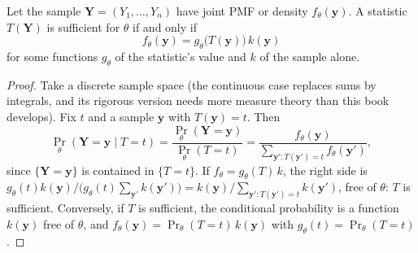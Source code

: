 \begin{theorem}
\label{thm:factorization}
Let the sample $\mathbf{Y} = (Y_1, \ldots, Y_n)$ have joint PMF or density $f_\theta(\mathbf{y})$.
A statistic $T(\mathbf{Y})$ is sufficient for $\theta$ if and only if
\[
f_\theta(\mathbf{y}) = g_\theta\big(T(\mathbf{y})\big)\,k(\mathbf{y})
\]
for some functions $g_\theta$ of the statistic's value and $k$ of the sample alone.
\end{theorem}
\begin{proof}
Take a discrete sample space (the continuous case replaces sums by integrals, and its rigorous version needs more measure theory than this book develops).
Fix $t$ and a sample $\mathbf{y}$ with $T(\mathbf{y}) = t$.
Then
\[
\Pr_\theta(\mathbf{Y} = \mathbf{y} \mid T = t) = \frac{\Pr_\theta(\mathbf{Y} = \mathbf{y})}{\Pr_\theta(T = t)} = \frac{f_\theta(\mathbf{y})}{\sum_{\mathbf{y}' : T(\mathbf{y}') = t} f_\theta(\mathbf{y}')},
\]
since $\{\mathbf{Y} = \mathbf{y}\}$ is contained in $\{T = t\}$.
If $f_\theta = g_\theta(T)\,k$, the right side is $g_\theta(t)k(\mathbf{y})\big/\big(g_\theta(t)\sum_{\mathbf{y}'}k(\mathbf{y}')\big) = k(\mathbf{y})/\sum_{\mathbf{y}' : T(\mathbf{y}') = t}k(\mathbf{y}')$, free of $\theta$: $T$ is sufficient.
Conversely, if $T$ is sufficient, the conditional probability is a function $k(\mathbf{y})$ free of $\theta$, and $f_\theta(\mathbf{y}) = \Pr_\theta(T = t)\,k(\mathbf{y})$ with $g_\theta(t) = \Pr_\theta(T = t)$.
\end{proof}

